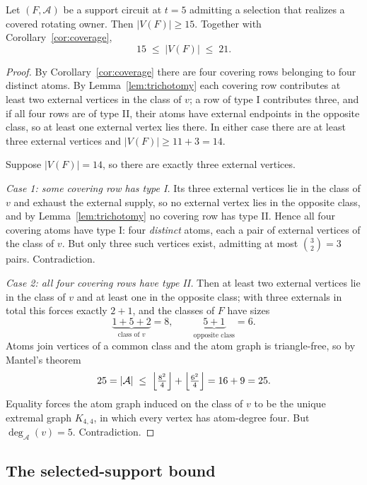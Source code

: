 \begin{theorem}\label{thm:order15}
Let \((F,\mathcal A)\) be a support circuit at \(t=5\) admitting a
selection that realizes a covered rotating owner. Then
\(|V(F)|\ge15\). Together with Corollary~\ref{cor:coverage},
\[
15\;\le\;|V(F)|\;\le\;21 .
\]
\end{theorem}

\begin{proof}
By Corollary~\ref{cor:coverage} there are four covering rows belonging
to four distinct atoms. By Lemma~\ref{lem:trichotomy} each covering
row contributes at least two external vertices in the class of \(v\);
a row of type I contributes three, and if all four rows are of type
II, their atoms have external endpoints in the opposite class, so at
least one external vertex lies there. In either case there are at
least three external vertices and \(|V(F)|\ge11+3=14\).

Suppose \(|V(F)|=14\), so there are exactly three external vertices.

\emph{Case 1: some covering row has type I.} Its three external
vertices lie in the class of \(v\) and exhaust the external supply, so
no external vertex lies in the opposite class, and by
Lemma~\ref{lem:trichotomy} no covering row has type II. Hence all four
covering atoms have type I: four \emph{distinct} atoms, each a pair of
external vertices of the class of \(v\). But only three such vertices
exist, admitting at most \(\binom32=3\) pairs. Contradiction.

\emph{Case 2: all four covering rows have type II.} Then at least two
external vertices lie in the class of \(v\) and at least one in the
opposite class; with three externals in total this forces exactly
\(2+1\), and the classes of \(F\) have sizes
\[
\underbrace{1+5+2}_{\text{class of }v}=8,
\qquad
\underbrace{5+1}_{\text{opposite class}}=6 .
\]
Atoms join vertices of a common class and the atom graph is
triangle-free, so by Mantel's theorem
\[
25=|\mathcal A|\;\le\;\Bigl\lfloor\tfrac{8^2}{4}\Bigr\rfloor
+\Bigl\lfloor\tfrac{6^2}{4}\Bigr\rfloor=16+9=25 .
\]
Equality forces the atom graph induced on the class of \(v\) to be the
unique extremal graph \(K_{4,4}\), in which every vertex has
atom-degree four. But \(\deg_{\mathcal A}(v)=5\). Contradiction.
\end{proof}

\subsection{The selected-support bound}


